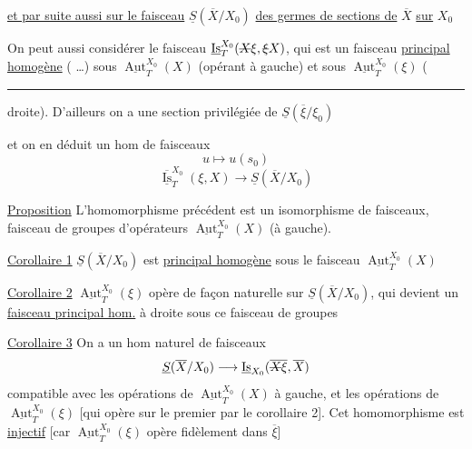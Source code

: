 \uline{et par suite aussi sur le faisceau} $\boxed{\underline S(\overline X/X_0)}$ \uline{des germes de sections de} $\overline X$ \uline{sur} $X_0$

On peut aussi considérer le faisceau $\underline{\operatorname{Is}}_T^{X_0}(\deleted{X}\xi,\deleted{\xi}X)$, qui est un faisceau \uline{principal homogène} ( \ldots) sous $\underline{\operatorname{Aut}}_T^{X_0}(X)$ (opérant à gauche) et sous $\underline{\operatorname{Aut}}_T^{X_0}(\xi)$ (\rule{2.5cm}{0.35pt} droite). D'ailleurs on a une section privilégiée  de $\underline S(\overline{\xi}/\xi_0)$

et on en déduit un hom de faisceaux
\[
u\longmapsto u(s_0)
\]
\[
\overline{\underline{\operatorname{Is}}}_T^{X_0}(\xi,X)\longrightarrow\underline S(\overline X/X_0)
\]

\uline{Proposition} L'homomorphisme précédent est un isomorphisme de faisceaux,   faisceau de groupes d'opérateurs $\underline{\operatorname{Aut}}_T^{X_0}(X)$ (à gauche).

\uline{Corollaire 1} $\underline S(\overline X/X_0)$ est \uline{principal homogène} sous le faisceau $\underline{\operatorname{Aut}}_T^{X_0}(X)$

\uline{Corollaire 2} $\underline{\operatorname{Aut}}_T^{X_0}(\xi)$ opère de façon naturelle  sur $\underline S(\overline X/X_0)$, qui devient un \uline{faisceau principal hom.} à droite sous ce faisceau de groupes 

\uline{Corollaire 3} On a un hom naturel de faisceaux
\[
\underline S(\overline X/X_0)\longrightarrow\underline{\operatorname{Is}}_{X_0}(\overline{\deleted{X}\xi},\overline X)
\]
compatible avec les opérations de $\underline{\operatorname{Aut}}_T^{X_0}(X)$ à gauche, et les opérations  de $\underline{\operatorname{Aut}}_T^{X_0}(\xi)$ [qui opère sur le premier  par le corollaire 2]. Cet homomorphisme est \uline{injectif} [car $\underline{\operatorname{Aut}}_T^{X_0}(\xi)$ opère fidèlement dans $\overline\xi$]

